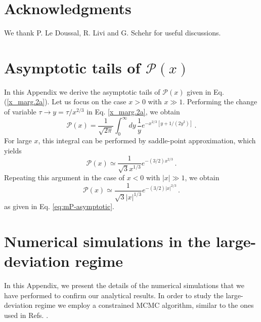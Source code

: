 \documentclass[aps,pre,twocolumn,superscriptaddress,showpacs]{revtex4-1}
\newcommand{\be}{\begin{equation}}
\newcommand{\ee}{\end{equation}}
\newcommand{\mP}{\mathcal{P}}
\begin{document}
\section*{Acknowledgments}

We thank P. Le Doussal, R. Livi and G. Schehr for useful discussions.


\appendix


\section{Asymptotic tails of $\mP(x)$}
\label{app:Asymp_Px}

In this Appendix we derive the asymptotic tails of $\mP(x)$ given in Eq. (\ref{x_marg.2a}). Let us focus on the case $x>0$ with $x\gg 1$. Performing the change of variable $\tau\to y=\tau/x^{2/3}$ in Eq. \eqref{x_marg.2a}, we obtain
\be 
\mP(x)=\frac{1}{\sqrt{2\pi}}\int_{0}^{\infty}dy\,\frac{1}{y}e^{-x^{2/3}[ y+1/(2y^2)]}\,.
\ee
For large $x$, this integral can be performed by saddle-point approximation, which yields
\be 
\mP(x)\simeq\frac{1}{\sqrt{3}x^{1/3}}e^{-(3/2) x^{2/3}}\,.
\ee
Repeating this argument in the case of $x<0$ with $|x|\gg 1$, we obtain
\be 
\mP(x)\simeq \frac{1}{\sqrt{3}|x|^{1/3}}e^{-(3/2)|x|^{2/3}}\,.
\ee
as given in Eq. \eqref{eq:mP-asymptotic}.



\section{Numerical simulations in the large-deviation regime}
\label{app:Monte-Carlo}

In this Appendix, we present the details of the numerical simulations that we have performed to confirm our analytical results. In order to study the large-deviation regime we employ a constrained MCMC algorithm, similar to the ones used in Refs. \cite{NMV10,NMV11,GM19,MLDM21}. 
\end{document}
